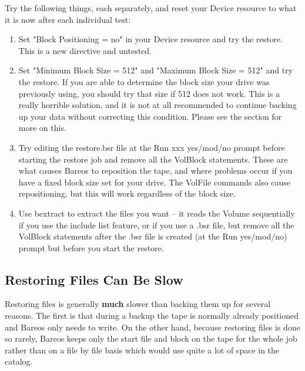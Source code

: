 Try the following things, each separately, and reset your Device resource to
what it is now after each individual test:

\begin{enumerate}
\item Set "Block Positioning = no" in your Device resource  and try the
   restore. This is a new directive and untested.

\item Set "Minimum Block Size = 512" and "Maximum  Block Size = 512" and
   try the restore.  If you are able to determine the block size your drive
   was previously using, you should try that size if 512 does not work.
   This is a really horrible solution, and it is not at all recommended
   to continue backing up your data without correcting this condition.
   Please see the  section for more on this.

\item Try editing the restore.bsr file at the Run xxx yes/mod/no prompt
   before starting the restore job and remove all the VolBlock statements.
   These are what causes Bareos to reposition the tape, and where problems
   occur if you have a fixed block size set for your drive.  The VolFile
   commands also cause repositioning, but this will work regardless of the
   block size.

\item Use bextract to extract the files you want -- it reads the  Volume
   sequentially if you use the include list feature, or if you use a .bsr
   file, but remove all the VolBlock statements after the .bsr file is
   created (at the Run yes/mod/no) prompt but before you start the restore.
\end{enumerate}


\subsection{Restoring Files Can Be Slow}


Restoring files is generally {\bf much} slower than backing them up for several
reasons. The first is that during a backup the tape is normally already
positioned and Bareos only needs to write. On the other hand, because restoring
files is done so rarely, Bareos keeps only the start file and block on the
tape for the whole job rather than on a file by file basis which would use
quite a lot of space in the catalog.

